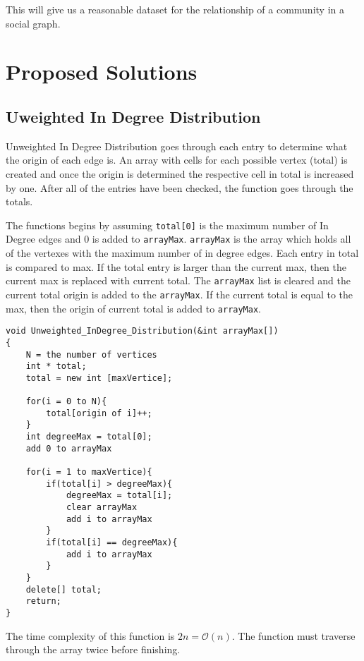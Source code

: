 \documentclass{article}
\begin{document}
This will give us a reasonable dataset for the relationship of a community in a social graph.

\section{Proposed Solutions}
\subsection{Uweighted In Degree Distribution}
Unweighted In Degree Distribution goes through each entry to determine what the origin of each edge is. An array with cells for each possible vertex (total) is created and once the origin is determined the respective cell in total is increased by one. After all of the entries have been checked, the function goes through the totals.

The functions begins by assuming \texttt{total[0]} is the maximum number of In Degree edges and $0$ is added to \texttt{arrayMax}. \texttt{arrayMax} is the array which holds all of the vertexes with the maximum number of in degree edges. Each entry in total is compared to max. If the total entry is larger than the current max, then the current max is replaced with current total. The \texttt{arrayMax} list is cleared and the current total origin is added to the \texttt{arrayMax}. If the current total is equal to the max, then the origin of current total is added to \texttt{arrayMax}.

\begin{verbatim}
void Unweighted_InDegree_Distribution(&int arrayMax[])
{
    N = the number of vertices
    int * total;
    total = new int [maxVertice];

    for(i = 0 to N){
        total[origin of i]++;
    }
    int degreeMax = total[0];
    add 0 to arrayMax

    for(i = 1 to maxVertice){
        if(total[i] > degreeMax){
            degreeMax = total[i];
            clear arrayMax
            add i to arrayMax
        }
        if(total[i] == degreeMax){
            add i to arrayMax
        }
    }
    delete[] total;
    return;
}
\end{verbatim}

The time complexity of this function is $2n = \mathcal{O}(n)$. The function must traverse through the array twice before finishing.
\end{document}
